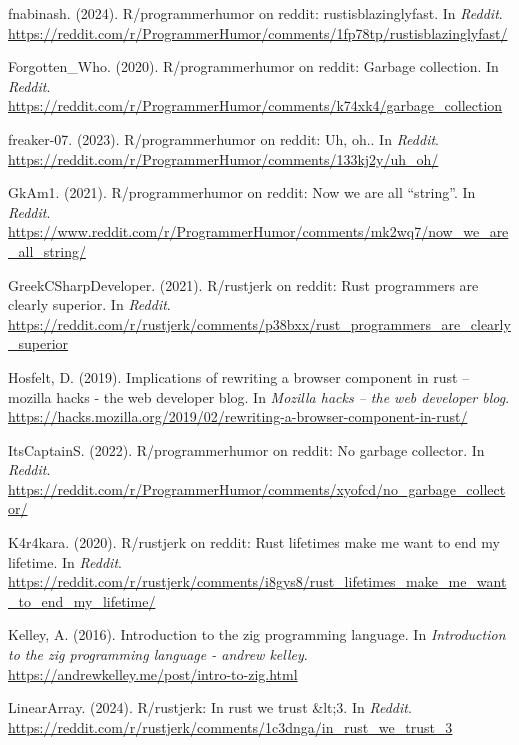 \documentclass[11pt]{article}
\begin{document}
\begin{hangparas}{1.5em}{1}
\hypertarget{citeproc_bib_item_12}{fnabinash. (2024). R/programmerhumor on reddit: rustisblazinglyfast. In \textit{Reddit}. \url{https://reddit.com/r/ProgrammerHumor/comments/1fp78tp/rustisblazinglyfast/}}

\hypertarget{citeproc_bib_item_13}{Forgotten\_Who. (2020). R/programmerhumor on reddit: Garbage collection. In \textit{Reddit}. \url{https://reddit.com/r/ProgrammerHumor/comments/k74xk4/garbage_collection}}

\hypertarget{citeproc_bib_item_14}{freaker-07. (2023). R/programmerhumor on reddit: Uh, oh.. In \textit{Reddit}. \url{https://reddit.com/r/ProgrammerHumor/comments/133kj2y/uh_oh/}}

\hypertarget{citeproc_bib_item_15}{GkAm1. (2021). R/programmerhumor on reddit: Now we are all “string”. In \textit{Reddit}. \url{https://www.reddit.com/r/ProgrammerHumor/comments/mk2wq7/now_we_are_all_string/}}

\hypertarget{citeproc_bib_item_16}{GreekCSharpDeveloper. (2021). R/rustjerk on reddit: Rust programmers are clearly superior. In \textit{Reddit}. \url{https://reddit.com/r/rustjerk/comments/p38bxx/rust_programmers_are_clearly_superior}}

\hypertarget{citeproc_bib_item_17}{Hosfelt, D. (2019). Implications of rewriting a browser component in rust – mozilla hacks - the web developer blog. In \textit{Mozilla hacks – the web developer blog}. \url{https://hacks.mozilla.org/2019/02/rewriting-a-browser-component-in-rust/}}

\hypertarget{citeproc_bib_item_18}{ItsCaptainS. (2022). R/programmerhumor on reddit: No garbage collector. In \textit{Reddit}. \url{https://reddit.com/r/ProgrammerHumor/comments/xyofcd/no_garbage_collector/}}

\hypertarget{citeproc_bib_item_19}{K4r4kara. (2020). R/rustjerk on reddit: Rust lifetimes make me want to end my lifetime. In \textit{Reddit}. \url{https://reddit.com/r/rustjerk/comments/i8gys8/rust_lifetimes_make_me_want_to_end_my_lifetime/}}

\hypertarget{citeproc_bib_item_20}{Kelley, A. (2016). Introduction to the zig programming language. In \textit{Introduction to the zig programming language - andrew kelley}. \url{https://andrewkelley.me/post/intro-to-zig.html}}

\hypertarget{citeproc_bib_item_21}{LinearArray. (2024). R/rustjerk: In rust we trust \&lt;3. In \textit{Reddit}. \url{https://reddit.com/r/rustjerk/comments/1c3dnga/in_rust_we_trust_3}}


\end{hangparas}
\end{document}
